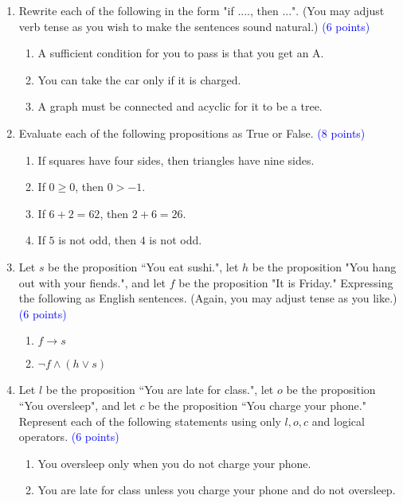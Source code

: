 \documentclass{article}
\newcommand{\pt}[1]{\textcolor{blue}{(#1 points)}}
\begin{document}
\begin{enumerate}

    \item Rewrite each of the following in the form "if ...., then ...".  (You may adjust verb tense as you wish to make the sentences sound natural.) \pt 6
    \begin{enumerate}
        \item A sufficient condition for you to pass is that you get an A.
        \item You can take the car only if it is charged.
        \item A graph must be connected and acyclic for it to be a tree.
    \end{enumerate}
    
    \item Evaluate each of the following propositions as True or False. \pt 8
    \begin{enumerate}
        \item If squares have four sides, then triangles have nine sides.
        \item If $0 \geq 0$, then $0 > -1$.
        \item If $6+2 = 62$, then $2+6=26$.
        \item If $5$ is not odd, then $4$ is not odd. 
    \end{enumerate}
    
    \item Let $s$ be the proposition ``You eat sushi.", let $h$ be the proposition "You hang out with your fiends.", and let $f$ be the proposition "It is Friday." Expressing the following as English sentences. (Again, you may adjust tense as you like.) \pt 6
    \begin{enumerate}
        \item $f \rightarrow s$
        \item $\lnot f \wedge (h \lor s)$
    \end{enumerate}
    
    \item Let $l$ be the proposition ``You are late for class.", let $o$ be the proposition ``You oversleep", and let $c$ be the proposition ``You charge your phone." Represent each of the following statements using only $l, o, c$ and logical operators. \pt 6
    \begin{enumerate}
        \item You oversleep only when you do not charge your phone.
        \item You are late for class unless you charge your phone and do not oversleep.
    \end{enumerate}
    

\end{enumerate}
\end{document}
